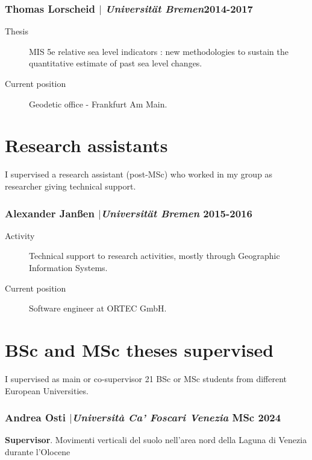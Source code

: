 \documentclass[11pt]{article}
\begin{document}
\subsubsection{Thomas Lorscheid $|$ {\normalfont\textit{Universität Bremen}}\hfill 2014-2017}
{\footnotesize 
\begin{description}
  \item [Thesis] MIS 5e relative sea level indicators : new methodologies to sustain the quantitative estimate of past sea level changes.
  \item [Current position] Geodetic office - Frankfurt Am Main.
\end{description}
}

\section{Research assistants}
{\normalfont I supervised a research assistant (post-MSc) who worked in my group as researcher giving technical support.}\\

\subsubsection{Alexander Janßen $|${\normalfont\textit{Universität Bremen}} \hfill 2015-2016}
{\footnotesize 
\begin{description}
  \item [Activity] Technical support to research activities, mostly through Geographic Information Systems. 
  \item [Current position] Software engineer at ORTEC GmbH.

\end{description}
}

\section{BSc and MSc theses supervised}
{\normalfont I supervised as main or co-supervisor 21 BSc or MSc students from different European Universities.}\\

\subsubsection{Andrea Osti $|${\normalfont\textit{Università Ca' Foscari Venezia}} \hfill MSc 2024}
{\footnotesize 
\textbf{Supervisor}. Movimenti verticali del suolo nell’area nord della Laguna di Venezia durante l’Olocene}
\end{document}
